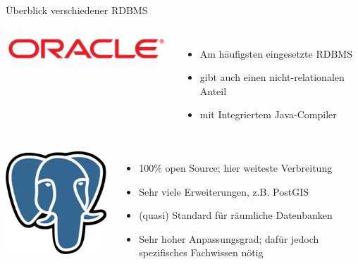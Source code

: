\documentclass[18pt]{beamer}
\begin{document}
\begin{frame}{Überblick verschiedener RDBMS}
\begin{columns}
	\includegraphics[width=0.99\textwidth]{images/oracle} 
  \begin{itemize}
  \item Am häufigsten eingesetzte RDBMS
  \item gibt auch einen nicht-relationalen Anteil
  \item mit Integriertem Java-Compiler
  \end{itemize}
\end{columns}\medskip\par

\begin{columns}
	\includegraphics[width=0.99\textwidth]{images/postgres} 
  \begin{itemize}
  \item 100\% open Source; hier weiteste Verbreitung
  \item Sehr viele Erweiterungen, z.B. PostGIS
  \item (quasi) Standard für räumliche Datenbanken
  \item Sehr hoher Anpassungsgrad; dafür jedoch spezifisches Fachwissen nötig
  \end{itemize}
\end{columns}

\end{frame}
\end{document}
